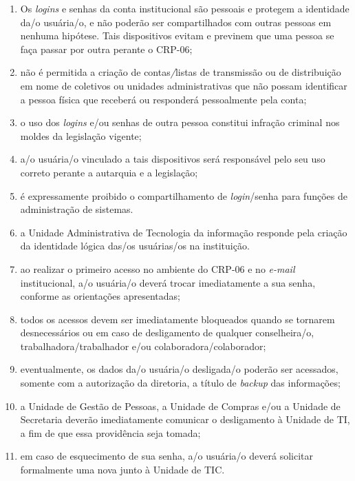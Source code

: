 \documentclass[openright, twoside, a4paper]{memoir}
\begin{document}
\begin{enumerate}

\item
    Os \emph{logins} e senhas da conta institucional são pessoais e
    protegem a identidade da/o usuária/o, e não poderão ser compartilhados
    com outras pessoas em nenhuma hipótese. Tais dispositivos evitam e
    previnem que uma pessoa se faça passar por outra perante o CRP-06;
\item
    não é permitida a criação de contas\emph{/}listas de transmissão ou de
    distribuição em nome de coletivos ou unidades administrativas que não
    possam identificar a pessoa física que receberá ou responderá
    pessoalmente pela conta;
\item
    o uso dos \emph{logins} e/ou senhas de outra pessoa constitui infração
    criminal nos moldes da legislação vigente;
\item
    a/o usuária/o vinculado a tais dispositivos será responsável pelo seu
    uso correto perante a autarquia e a legislação;
\item
    é expressamente proibido o compartilhamento de \emph{login}/senha para
    funções de administração de sistemas.
\item
    a Unidade Administrativa de Tecnologia da informação responde pela
    criação da identidade lógica das/os usuárias/os na instituição.
\item
    ao realizar o primeiro acesso no ambiente do CRP-06 e no \emph{e-mail}
    institucional, a/o usuária/o deverá trocar imediatamente a sua senha,
    conforme as orientações apresentadas;
\item
    todos os acessos devem ser imediatamente bloqueados quando se tornarem
    desnecessários ou em caso de desligamento de qualquer conselheira/o,
    trabalhadora/trabalhador e/ou colaboradora/colaborador;
\item
    eventualmente, os dados da/o usuária/o desligada/o poderão ser
    acessados, somente com a autorização da diretoria, a título de
    \emph{backup} das informações;
\item
    a Unidade de Gestão de Pessoas, a Unidade de Compras e/ou a Unidade de
    Secretaria deverão imediatamente comunicar o desligamento à Unidade de
    TI, a fim de que essa providência seja tomada;
\item
    em caso de esquecimento de sua senha, a/o usuária/o deverá solicitar
    formalmente uma nova junto à Unidade de TIC.
\end{enumerate}
\end{document}

